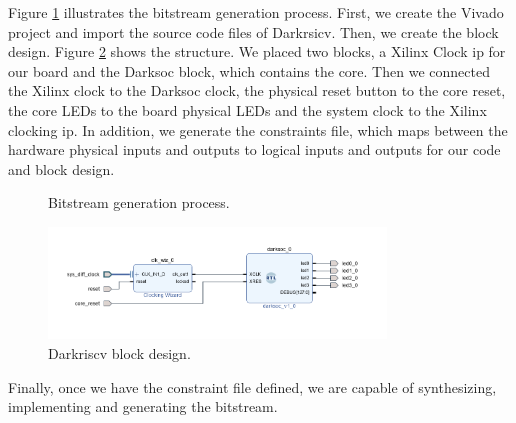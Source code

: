 Figure \ref{fig:bitstream_gen} illustrates the bitstream generation process. 
First, we create the Vivado project and import the source code files of Darkrsicv.  Then, we create the block design. Figure \ref{fig:block_design} shows the structure. We placed two blocks, a Xilinx Clock \gls{ip} for our board and the Darksoc block, which contains the core. Then we connected the Xilinx clock to the Darksoc clock, the physical reset button to the core reset, the core LEDs to the board physical LEDs and the system clock to the Xilinx clocking \gls{ip}. In addition, we generate the constraints file, which maps between the hardware physical inputs and outputs to logical inputs and outputs for our code and block design.

\begin{figure}[h]
    \centering
    \caption{Bitstream generation process.}
    \label{fig:bitstream_gen}
\end{figure}

\begin{figure}[h]
  \centering
  \includegraphics[width=0.8\textwidth]{../presentation/images/block-design.png}
  \caption{Darkriscv block design.}
  \label{fig:block_design}
\end{figure}

Finally, once we have the constraint file defined, we are capable of synthesizing, implementing and generating the bitstream. 


